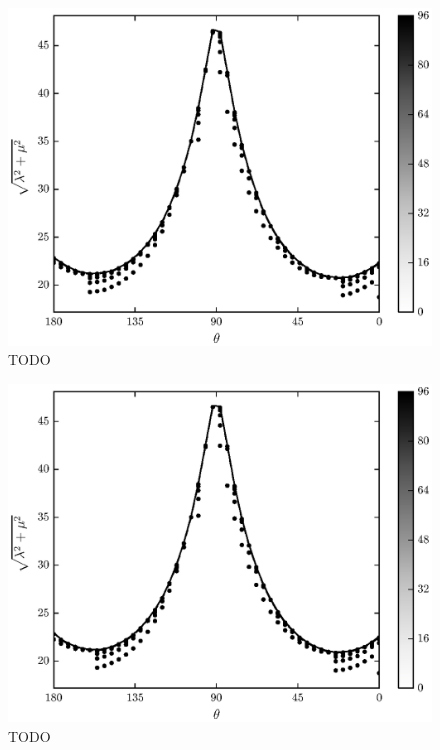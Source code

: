 	\begin{figure}
		\begin{center}
			\includegraphics{./fig/ch3/pull/eb0.1_et0.1/grid.eps}
		\end{center}		
		\caption{ TODO
		\label{fig:PullGrid:eb0.1_et0.1}}
	\end{figure}
	
	\begin{figure}
		\begin{center}
			\includegraphics{./fig/ch3/pull/eb0.1_et0.1_e0.1/grid.eps}
		\end{center}		
		\caption{ TODO
		\label{fig:PullGrid:eb0.1_et0.1_e0.1}}
	\end{figure}
	
